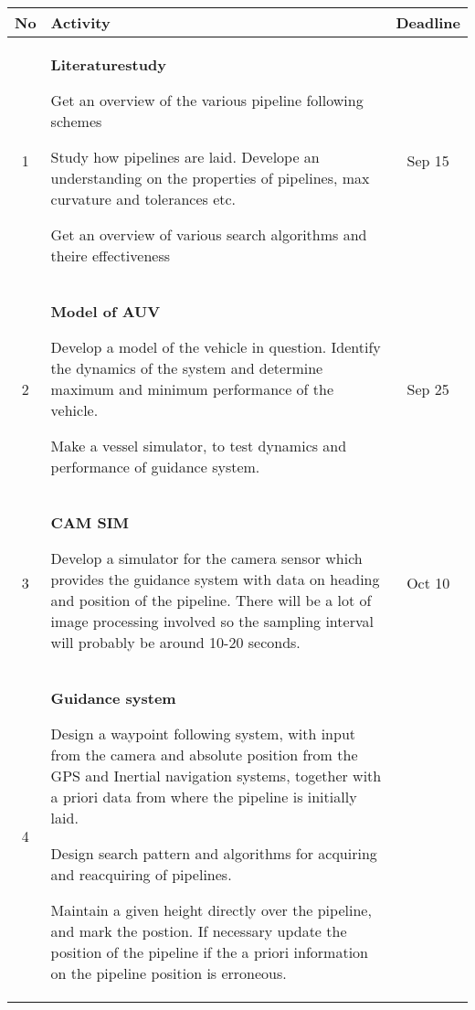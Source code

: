 \documentclass[a4paper,10pt]{article}
\newenvironment{myitemize}
{
    \begin{list}{- \ }{}
        \setlength{\topsep}{0pt}
        \setlength{\parskip}{0pt}
        \setlength{\partopsep}{0pt}
        \setlength{\parsep}{0pt}
        \setlength{\itemsep}{0pt} 
}
{
    \end{list} 
}
\begin{document}
	\begin{tabular}{| c | p{9cm} || c |}
	\hline
	No 	&	Activity	&	Deadline \\
	\hline
	\hline
	1	&	\textbf{Literaturestudy}\begin{myitemize}
	 	 				 \item Get an overview of the various pipeline following schemes
	 	 				 \item Study how pipelines are laid. Develope an understanding on the properties of pipelines, max curvature and tolerances etc.
	 	 				 \item Get an overview of various search algorithms and theire effectiveness
	 	 				\end{myitemize}	
								& 	Sep 15\\
	\hline
	2	&	\textbf{Model of AUV}	\begin{myitemize}
	 	 	            		 \item Develop a model of the vehicle in question. Identify the dynamics of the system and determine maximum and minimum performance of the vehicle. 
						 \item Make a vessel simulator, to test dynamics and performance of guidance system.
	 	 	            		\end{myitemize}
								&	Sep 25\\
	\hline
	3	&	\textbf{CAM SIM}	\begin{myitemize}
	 	 	       			 \item Develop a simulator for the camera sensor which provides the guidance system with data on heading and position of the pipeline. There will be a lot of image processing involved so the sampling interval will probably be around 10-20 seconds.
	 	 	       			\end{myitemize}
								&	Oct 10 \\
	\hline
	4	&	\textbf{Guidance system}\begin{myitemize}
	 	 	               		 \item Design a waypoint following system, with input from the camera and absolute position from the GPS and Inertial navigation systems, together with a priori data from where the pipeline is initially laid. 
	 	 	               		 \item Design search pattern and algorithms for acquiring and reacquiring of pipelines. 
	 	 	               		 \item Maintain a given height directly over the pipeline, and mark the postion. If necessary update the position of the pipeline if the a priori information on the pipeline position is erroneous. 

\end{myitemize}
\end{tabular}
\end{document}
